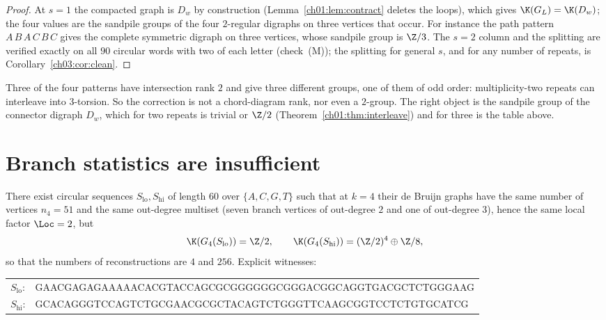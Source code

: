 \begin{proof}
At $s=1$ the compacted graph is $D_w$ by construction (Lemma~\ref{ch01:lem:contract} deletes
the loops), which gives $\K(G_L)=\K(D_w)$; the four values are the sandpile groups of the
four $2$-regular digraphs on three vertices that occur. For instance the path pattern
$A\,B\,A\,C\,B\,C$ gives the complete symmetric digraph on three vertices, whose sandpile
group is $\Z/3$. The $s=2$ column and the splitting are verified exactly on all $90$
circular words with two of each letter (check~(M)); the splitting for general $s$, and for
any number of repeats, is Corollary~\ref{ch03:cor:clean}.
\end{proof}

\begin{remark}\label{ch01:rem:notrank}
Three of the four patterns have intersection rank $2$ and give three different groups,
one of them of odd order: multiplicity-two repeats can interleave into $3$-torsion. So the
correction is not a chord-diagram rank, nor even a $2$-group. The right object is the
sandpile group of the connector digraph $D_w$, which for two repeats is trivial or $\Z/2$
(Theorem~\ref{ch01:thm:interleave}) and for three is the table above.
\end{remark}

\section{Branch statistics are insufficient}\label{ch01:sec:notdeg}

\begin{theorem}\label{ch01:thm:notdeg}
There exist circular sequences $S_{\mathrm{lo}},S_{\mathrm{hi}}$ of length $60$ over
$\{A,C,G,T\}$ such that at $k=4$ their de Bruijn graphs have the same number of vertices
$n_4=51$ and the same out-degree multiset (seven branch vertices of out-degree $2$ and one
of out-degree $3$), hence the same local factor $\Loc=2$, but
\[
\K(G_4(S_{\mathrm{lo}}))=\Z/2,\qquad
\K(G_4(S_{\mathrm{hi}}))=(\Z/2)^{4}\oplus\Z/8 ,
\]
so that the numbers of reconstructions are $4$ and $256$. Explicit witnesses:
\begin{center}\ttfamily\small
\begin{tabular}{ll}
$S_{\mathrm{lo}}$: & GAACGAGAGAAAAACACGTACCAGCGCGGGGGGCGGGACGGCAGGTGACGCTCTGGGAAG\\
$S_{\mathrm{hi}}$: & GCACAGGGTCCAGTCTGCGAACGCGCTACAGTCTGGGTTCAAGCGGTCCTCTGTGCATCG\\
\end{tabular}
\end{center}
\end{theorem}

